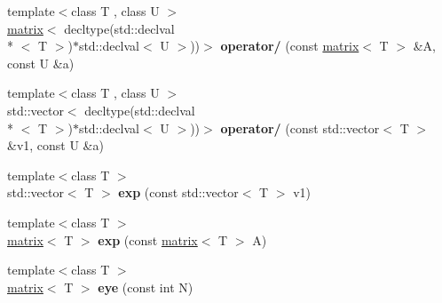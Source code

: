 \begin{DoxyCompactItemize}
\item 
\hypertarget{namespacekeycpp_a3852c35cfcc8caa784465a26d04c68a1}{{\footnotesize template$<$class T , class U $>$ }\\\hyperlink{classkeycpp_1_1matrix}{matrix}$<$ decltype(std\-::declval\\*
$<$ T $>$)$\ast$std\-::declval$<$ U $>$))$>$ {\bfseries operator/} (const \hyperlink{classkeycpp_1_1matrix}{matrix}$<$ T $>$ \&A, const U \&a)}\label{namespacekeycpp_a3852c35cfcc8caa784465a26d04c68a1}

\item 
\hypertarget{namespacekeycpp_a394f23f09cf122a8e8c20a7afd40f58e}{{\footnotesize template$<$class T , class U $>$ }\\std\-::vector$<$ decltype(std\-::declval\\*
$<$ T $>$)$\ast$std\-::declval$<$ U $>$))$>$ {\bfseries operator/} (const std\-::vector$<$ T $>$ \&v1, const U \&a)}\label{namespacekeycpp_a394f23f09cf122a8e8c20a7afd40f58e}

\item 
\hypertarget{namespacekeycpp_aa2d4f2ab79da4b10e9be3af2693904ef}{{\footnotesize template$<$class T $>$ }\\std\-::vector$<$ T $>$ {\bfseries exp} (const std\-::vector$<$ T $>$ v1)}\label{namespacekeycpp_aa2d4f2ab79da4b10e9be3af2693904ef}

\item 
\hypertarget{namespacekeycpp_a24ac535f72f9e72bf2d0fb93b2b0ee01}{{\footnotesize template$<$class T $>$ }\\\hyperlink{classkeycpp_1_1matrix}{matrix}$<$ T $>$ {\bfseries exp} (const \hyperlink{classkeycpp_1_1matrix}{matrix}$<$ T $>$ A)}\label{namespacekeycpp_a24ac535f72f9e72bf2d0fb93b2b0ee01}

\item 
\hypertarget{namespacekeycpp_a90a6f9aaec03f1f72bf4013316795c5f}{{\footnotesize template$<$class T $>$ }\\\hyperlink{classkeycpp_1_1matrix}{matrix}$<$ T $>$ {\bfseries eye} (const int N)}\label{namespacekeycpp_a90a6f9aaec03f1f72bf4013316795c5f}


\end{DoxyCompactItemize}
